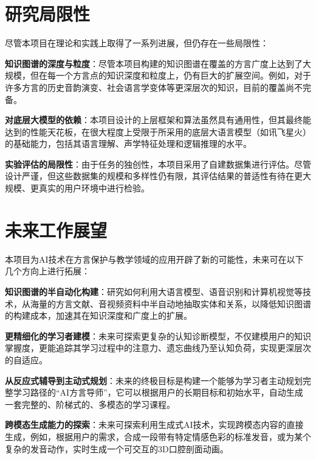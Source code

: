 \section{研究局限性}
尽管本项目在理论和实践上取得了一系列进展，但仍存在一些局限性：

\textbf{知识图谱的深度与粒度}：尽管本项目构建的知识图谱在覆盖的方言广度上达到了大规模，但在每一个方言点的知识深度和粒度上，仍有巨大的扩展空间。例如，对于许多方言的历史音韵演变、社会语言学变体等更深层次的知识，目前的覆盖尚不完备。

\textbf{对底层大模型的依赖}：本项目设计的上层框架和算法虽然具有通用性，但其最终能达到的性能天花板，在很大程度上受限于所采用的底层大语言模型（如讯飞星火）的基础能力，包括其语言理解、声学特征处理和逻辑推理的水平。

\textbf{实验评估的局限性}：由于任务的独创性，本项目采用了自建数据集进行评估。尽管设计严谨，但这些数据集的规模和多样性仍有限，其评估结果的普适性有待在更大规模、更真实的用户环境中进行检验。

\section{未来工作展望}
本项目为AI技术在方言保护与教学领域的应用开辟了新的可能性，未来可在以下几个方向上进行拓展：

\textbf{知识图谱的半自动化构建}：研究如何利用大语言模型、语音识别和计算机视觉等技术，从海量的方言文献、音视频资料中半自动地抽取实体和关系，以降低知识图谱的构建成本，加速其在知识深度和广度上的扩展。

\textbf{更精细化的学习者建模}：未来可探索更复杂的认知诊断模型，不仅建模用户的知识掌握度，更能追踪其学习过程中的注意力、遗忘曲线乃至认知负荷，实现更深层次的自适应。

\textbf{从反应式辅导到主动式规划}：未来的终极目标是构建一个能够为学习者主动规划完整学习路径的“AI方言导师”，它可以根据用户的长期目标和初始水平，自动生成一套完整的、阶梯式的、多模态的学习课程。

\textbf{跨模态生成能力的探索}：未来可探索利用生成式AI技术，实现跨模态内容的直接生成，例如，根据用户的需求，合成一段带有特定情感色彩的标准发音，或为某个复杂的发音动作，实时生成一个可交互的3D口腔剖面动画。

